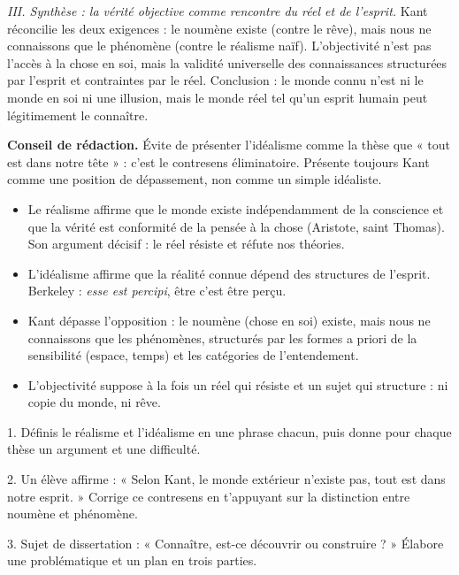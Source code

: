 \documentclass[11pt]{article}
\newcommand{\cle}[1]{{\popxbold\color{popdark}#1}}
\begin{document}
\begin{exoresolu}
\emph{III. Synthèse : la vérité objective comme rencontre du réel et de l'esprit.} Kant réconcilie les deux exigences : le noumène existe (contre le rêve), mais nous ne connaissons que le phénomène (contre le réalisme naïf). L'objectivité n'est pas l'accès à la chose en soi, mais la validité universelle des connaissances structurées par l'esprit et contraintes par le réel. Conclusion : le monde connu n'est ni le monde en soi ni une illusion, mais le monde réel tel qu'un esprit humain peut légitimement le connaître.

\textbf{Conseil de rédaction.} Évite de présenter l'idéalisme comme la thèse que « tout est dans notre tête » : c'est le contresens éliminatoire. Présente toujours Kant comme une position de dépassement, non comme un simple idéaliste.
\end{exoresolu}

\begin{aretenir}
\begin{itemize}
\item Le \cle{réalisme} affirme que le monde existe indépendamment de la conscience et que la vérité est conformité de la pensée à la chose (Aristote, saint Thomas). Son argument décisif : le réel résiste et réfute nos théories.
\item L'\cle{idéalisme} affirme que la réalité connue dépend des structures de l'esprit. Berkeley : \emph{esse est percipi}, être c'est être perçu.
\item Kant dépasse l'opposition : le \cle{noumène} (chose en soi) existe, mais nous ne connaissons que les \cle{phénomènes}, structurés par les formes a priori de la sensibilité (espace, temps) et les catégories de l'entendement.
\item L'objectivité suppose à la fois un réel qui résiste et un sujet qui structure : ni copie du monde, ni rêve.
\end{itemize}
\end{aretenir}

\begin{exercice}
1. Définis le réalisme et l'idéalisme en une phrase chacun, puis donne pour chaque thèse un argument et une difficulté.

2. Un élève affirme : « Selon Kant, le monde extérieur n'existe pas, tout est dans notre esprit. » Corrige ce contresens en t'appuyant sur la distinction entre noumène et phénomène.

3. Sujet de dissertation : « Connaître, est-ce découvrir ou construire ? » Élabore une problématique et un plan en trois parties.
\end{exercice}
\end{document}
